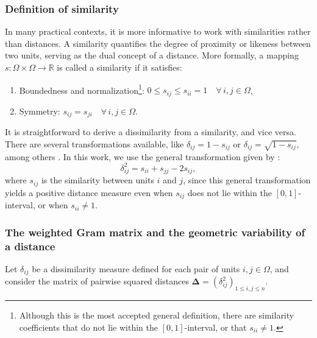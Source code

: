 \subsubsection{Definition of similarity}
In many practical contexts, it is more informative to work with similarities rather than distances. A similarity quantifies the degree of proximity or likeness between two units, serving as the dual concept of a distance.
More formally, a mapping $s : \Omega \times \Omega \longrightarrow \mathbb{R}$ is called a similarity if it satisfies:
\begin{enumerate}
\item[(i)] Boundedness and normalization\footnote{Although this is the most accepted general definition, there are similarity coefficients that do not lie within the $[0,1]$-interval, or that $s_{ii} \neq 1$.}: 
        $0 \leq s_{ij} \leq s_{ii} = 1 \quad \forall\, i, j \in \Omega$,
\item[(ii)] Symmetry: 
        $s_{ij} = s_{ji} \quad \forall\, i, j \in \Omega$.
\end{enumerate}

It is straightforward to derive a dissimilarity from a similarity, and vice versa. There are several transformations available, like $\delta_{ij}=1-s_{ij}$ or $\delta_{ij}=\sqrt{1-s_{ij}}$, among others \citep{gower1986metric}.
In this work, we use the general transformation given by \cite{GowerJ.C.1966SDPo}:
\begin{equation*}
   \delta^2_{ij} = s_{ii} + s_{jj} - 2s_{ij},
\end{equation*}
where $s_{ij}$ is the similarity between units $i$ and $j$, since this general transformation yields a positive distance measure even when $s_{ij}$ does not lie within the $[0,1]$-interval, or when $s_{ii} \neq 1$.

\subsubsection{The weighted Gram matrix and the geometric variability of a distance}
Let $\delta_{ij}$ be a dissimilarity measure defined for each pair of units $i,j \in \Omega$, and consider the matrix of pairwise squared distances $\mathbf{\Delta} = \left ( \delta_{ij}^{2}\right)_{1 \leq i,j \leq n}$.

